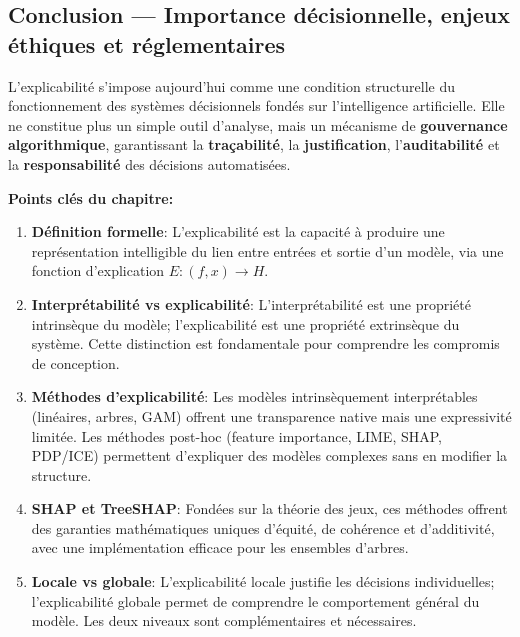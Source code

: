 \subsection{Conclusion — Importance décisionnelle, enjeux éthiques et réglementaires}

L’explicabilité s’impose aujourd’hui comme une condition structurelle du fonctionnement des systèmes décisionnels fondés sur l’intelligence artificielle. Elle ne constitue plus un simple outil d’analyse, mais un mécanisme de \textbf{gouvernance algorithmique}, garantissant la \textbf{traçabilité}, la \textbf{justification}, l’\textbf{auditabilité} et la \textbf{responsabilité} des décisions automatisées.

\vspace{4pt}

\textbf{Points clés du chapitre:}

\begin{enumerate}
    \item \textbf{Définition formelle}: L'explicabilité est la capacité à produire une représentation intelligible du lien entre entrées et sortie d'un modèle, via une fonction d'explication $E: (f, x) \rightarrow H$.
    
    \item \textbf{Interprétabilité vs explicabilité}: L'interprétabilité est une propriété intrinsèque du modèle; l'explicabilité est une propriété extrinsèque du système. Cette distinction est fondamentale pour comprendre les compromis de conception.
    
    \item \textbf{Méthodes d'explicabilité}: Les modèles intrinsèquement interprétables (linéaires, arbres, GAM) offrent une transparence native mais une expressivité limitée. Les méthodes post-hoc (feature importance, LIME, SHAP, PDP/ICE) permettent d'expliquer des modèles complexes sans en modifier la structure.
    
    \item \textbf{SHAP et TreeSHAP}: Fondées sur la théorie des jeux, ces méthodes offrent des garanties mathématiques uniques d'équité, de cohérence et d'additivité, avec une implémentation efficace pour les ensembles d'arbres.
    
    \item \textbf{Locale vs globale}: L'explicabilité locale justifie les décisions individuelles; l'explicabilité globale permet de comprendre le comportement général du modèle. Les deux niveaux sont complémentaires et nécessaires.
\end{enumerate}


